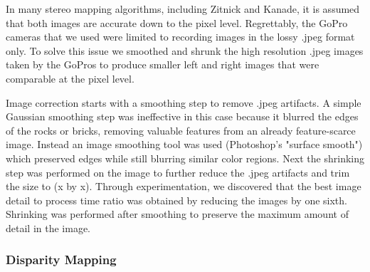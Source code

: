 \documentclass[a4paper,twoside]{article}
\begin{document}
In many stereo mapping algorithms, including Zitnick and Kanade, it is assumed that both images are accurate down to the pixel level.
Regrettably, the GoPro cameras that we used were limited to recording images in the lossy .jpeg format only.
To solve this issue we smoothed and shrunk the high resolution .jpeg images taken by the GoPros to produce smaller left and right images that were comparable at the pixel level.

Image correction starts with a smoothing step  to remove .jpeg artifacts.
  A simple Gaussian smoothing step was ineffective in this case because it blurred the edges of the rocks or bricks, removing valuable features from an already feature-scarce image.  Instead an image smoothing tool was used (Photoshop's "surface smooth") which preserved edges while still blurring similar color regions.  Next the shrinking step was performed on the image to further reduce the .jpeg artifacts and trim the size to (x by x).  Through experimentation, we discovered that the
best image detail to process time ratio was obtained by reducing the images by one sixth.   
Shrinking was performed after smoothing to preserve the maximum amount of detail in the image.  


\subsubsection{Disparity Mapping}
\label{subsec:disparity_mapping}
\end{document}
